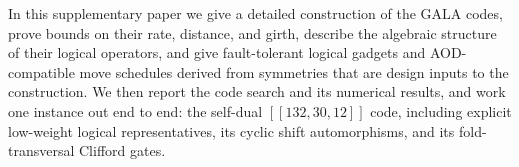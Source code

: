 \documentclass[amsmath,amssymb,twocolumn,aps,prl,superscriptaddress,nofootinbib]{revtex4-2}
\theoremstyle{definition}
\begin{document}
\GALAsmheader

\vspace{0.5em}
\begin{center}
\begin{minipage}{0.88\linewidth}
In this supplementary paper we give a detailed construction of the GALA codes, prove bounds on their rate, distance, and girth, describe the algebraic structure of their logical operators, and give fault-tolerant logical gadgets and AOD-compatible move schedules derived from symmetries that are design inputs to the construction. We then report the code search and its numerical results, and work one instance out end to end: the self-dual $[[132,30,12]]$ code, including explicit low-weight logical representatives, its cyclic shift automorphisms, and its fold-transversal Clifford gates.
\end{minipage}
\end{center}
\vspace{1em}

\tableofcontents
\clearpage








\clearpage

\end{document}
